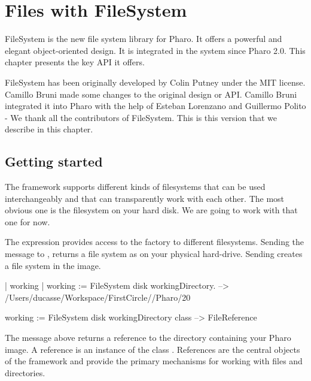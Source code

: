 \documentclass[a4paper,10pt,twoside]{book}
\begin{document}
\fi
\sloppy
\chapter{Files with FileSystem }
\chapterauthor{\authormax}
 
FileSystem is the new file system library for Pharo. It offers a powerful and elegant object-oriented design. 
It is integrated in the system since Pharo 2.0. This chapter presents the key API it offers. 

FileSystem has been originally developed by Colin Putney under the MIT license. Camillo Bruni made some changes to the original design or API. Camillo Bruni integrated it into Pharo with the help of Esteban Lorenzano and Guillermo Polito - We thank all the contributors of FileSystem. This is this version that we describe in this chapter. 

\section{Getting started}
The framework supports different kinds of filesystems that can be used interchangeably and that can transparently work with each other. The most obvious one is the filesystem on your hard disk. We are going to work with that one for now. 

The expression  provides access to the factory to different filesystems. 
Sending the message  to , returns a file system as on your physical hard-drive. Sending  creates a file system in the image. 

\begin{code}{}
| working |
working := FileSystem disk workingDirectory.
--> /Users/ducasse/Workspace/FirstCircle//Pharo/20

working := FileSystem disk workingDirectory class 
--> FileReference
\end{code} 

The message  above returns a reference to the directory containing your Pharo image. A reference is an instance of the class . References are the central objects of the framework and provide the primary mechanisms for working with files and directories. 
\end{document}
